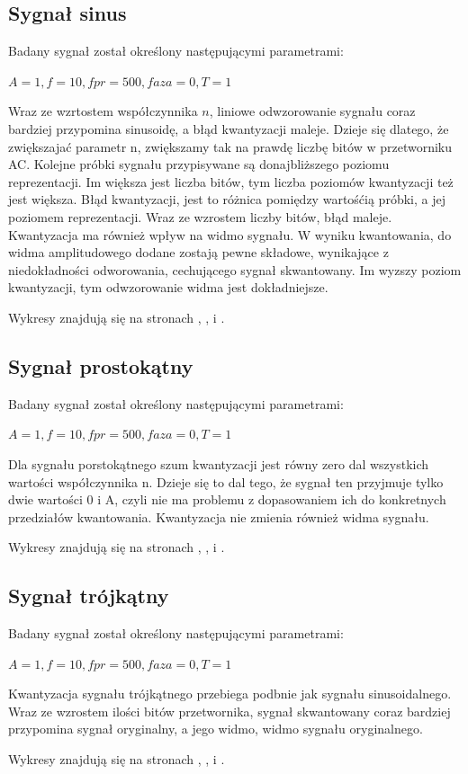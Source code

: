 \documentclass[wide,a4paper,titlepage,12pt]{mwart}
\begin{document}
		\subsection{Sygnał sinus}
			Badany sygnał został określony następującymi parametrami:
			
			$A=1, f=10, fpr=500, faza=0, T=1$
			\par
			Wraz ze wzrtostem współczynnika $n$, liniowe odwzorowanie sygnału coraz bardziej przypomina sinusoidę, a błąd kwantyzacji maleje. Dzieje się dlatego, że zwiększajać parametr n, zwiększamy tak na prawdę liczbę bitów w przetworniku AC. Kolejne próbki sygnału przypisywane są donajbliższego poziomu reprezentacji. Im większa jest liczba bitów, tym liczba poziomów kwantyzacji też jest większa. Błąd kwantyzacji, jest to różnica pomiędzy wartośćią próbki, a jej poziomem reprezentacji. Wraz ze wzrostem liczby bitów, błąd maleje. Kwantyzacja ma również wpływ na widmo sygnału. W wyniku kwantowania, do widma amplitudowego dodane zostają pewne składowe, wynikające z niedokładności odworowania, cechującego sygnał skwantowany. Im wyzszy poziom kwantyzacji, tym odwzorowanie widma jest dokładniejsze.
			\par
			Wykresy znajdują się na stronach \pageref{kwant1-1}, \pageref{kwant1-2}, \pageref{kwant1-4} i \pageref{kwant1-10}.

		\subsection{Sygnał prostokątny}
			Badany sygnał został określony następującymi parametrami:
			
			$A=1, f=10, fpr=500, faza=0, T=1$
			\par
			Dla sygnału porstokątnego szum kwantyzacji jest równy zero dal wszystkich wartości współczynnika n. Dzieje się to dal tego, że sygnał ten przyjmuje tylko dwie wartości 0 i A, czyli nie ma problemu z dopasowaniem ich do konkretnych przedziałów kwantowania. Kwantyzacja nie zmienia również widma sygnału.
			\par
			Wykresy znajdują się na stronach \pageref{kwant2-1}, \pageref{kwant2-2}, \pageref{kwant2-4} i \pageref{kwant2-10}.

		\subsection{Sygnał trójkątny}
			Badany sygnał został określony następującymi parametrami:
			
			$A=1, f=10, fpr=500, faza=0, T=1$
			\par
			Kwantyzacja sygnału trójkątnego przebiega podbnie jak sygnału sinusoidalnego. Wraz ze wzrostem ilości bitów przetwornika, sygnał skwantowany coraz bardziej przypomina sygnał oryginalny, a jego widmo, widmo sygnału oryginalnego.
			\par
			Wykresy znajdują się na stronach \pageref{kwant3-1}, \pageref{kwant3-2}, \pageref{kwant3-4} i \pageref{kwant3-10}.
		
\end{document}
